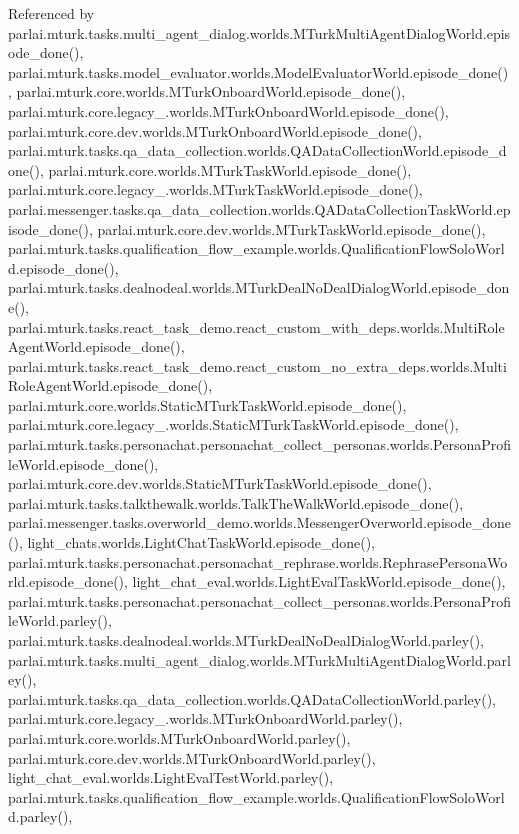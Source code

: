 Referenced by parlai.\+mturk.\+tasks.\+multi\+\_\+agent\+\_\+dialog.\+worlds.\+M\+Turk\+Multi\+Agent\+Dialog\+World.\+episode\+\_\+done(), parlai.\+mturk.\+tasks.\+model\+\_\+evaluator.\+worlds.\+Model\+Evaluator\+World.\+episode\+\_\+done(), parlai.\+mturk.\+core.\+worlds.\+M\+Turk\+Onboard\+World.\+episode\+\_\+done(), parlai.\+mturk.\+core.\+legacy\+\_.\+worlds.\+M\+Turk\+Onboard\+World.\+episode\+\_\+done(), parlai.\+mturk.\+core.\+dev.\+worlds.\+M\+Turk\+Onboard\+World.\+episode\+\_\+done(), parlai.\+mturk.\+tasks.\+qa\+\_\+data\+\_\+collection.\+worlds.\+Q\+A\+Data\+Collection\+World.\+episode\+\_\+done(), parlai.\+mturk.\+core.\+worlds.\+M\+Turk\+Task\+World.\+episode\+\_\+done(), parlai.\+mturk.\+core.\+legacy\+\_.\+worlds.\+M\+Turk\+Task\+World.\+episode\+\_\+done(), parlai.\+messenger.\+tasks.\+qa\+\_\+data\+\_\+collection.\+worlds.\+Q\+A\+Data\+Collection\+Task\+World.\+episode\+\_\+done(), parlai.\+mturk.\+core.\+dev.\+worlds.\+M\+Turk\+Task\+World.\+episode\+\_\+done(), parlai.\+mturk.\+tasks.\+qualification\+\_\+flow\+\_\+example.\+worlds.\+Qualification\+Flow\+Solo\+World.\+episode\+\_\+done(), parlai.\+mturk.\+tasks.\+dealnodeal.\+worlds.\+M\+Turk\+Deal\+No\+Deal\+Dialog\+World.\+episode\+\_\+done(), parlai.\+mturk.\+tasks.\+react\+\_\+task\+\_\+demo.\+react\+\_\+custom\+\_\+with\+\_\+deps.\+worlds.\+Multi\+Role\+Agent\+World.\+episode\+\_\+done(), parlai.\+mturk.\+tasks.\+react\+\_\+task\+\_\+demo.\+react\+\_\+custom\+\_\+no\+\_\+extra\+\_\+deps.\+worlds.\+Multi\+Role\+Agent\+World.\+episode\+\_\+done(), parlai.\+mturk.\+core.\+worlds.\+Static\+M\+Turk\+Task\+World.\+episode\+\_\+done(), parlai.\+mturk.\+core.\+legacy\+\_.\+worlds.\+Static\+M\+Turk\+Task\+World.\+episode\+\_\+done(), parlai.\+mturk.\+tasks.\+personachat.\+personachat\+\_\+collect\+\_\+personas.\+worlds.\+Persona\+Profile\+World.\+episode\+\_\+done(), parlai.\+mturk.\+core.\+dev.\+worlds.\+Static\+M\+Turk\+Task\+World.\+episode\+\_\+done(), parlai.\+mturk.\+tasks.\+talkthewalk.\+worlds.\+Talk\+The\+Walk\+World.\+episode\+\_\+done(), parlai.\+messenger.\+tasks.\+overworld\+\_\+demo.\+worlds.\+Messenger\+Overworld.\+episode\+\_\+done(), light\+\_\+chats.\+worlds.\+Light\+Chat\+Task\+World.\+episode\+\_\+done(), parlai.\+mturk.\+tasks.\+personachat.\+personachat\+\_\+rephrase.\+worlds.\+Rephrase\+Persona\+World.\+episode\+\_\+done(), light\+\_\+chat\+\_\+eval.\+worlds.\+Light\+Eval\+Task\+World.\+episode\+\_\+done(), parlai.\+mturk.\+tasks.\+personachat.\+personachat\+\_\+collect\+\_\+personas.\+worlds.\+Persona\+Profile\+World.\+parley(), parlai.\+mturk.\+tasks.\+dealnodeal.\+worlds.\+M\+Turk\+Deal\+No\+Deal\+Dialog\+World.\+parley(), parlai.\+mturk.\+tasks.\+multi\+\_\+agent\+\_\+dialog.\+worlds.\+M\+Turk\+Multi\+Agent\+Dialog\+World.\+parley(), parlai.\+mturk.\+tasks.\+qa\+\_\+data\+\_\+collection.\+worlds.\+Q\+A\+Data\+Collection\+World.\+parley(), parlai.\+mturk.\+core.\+legacy\+\_.\+worlds.\+M\+Turk\+Onboard\+World.\+parley(), parlai.\+mturk.\+core.\+worlds.\+M\+Turk\+Onboard\+World.\+parley(), parlai.\+mturk.\+core.\+dev.\+worlds.\+M\+Turk\+Onboard\+World.\+parley(), light\+\_\+chat\+\_\+eval.\+worlds.\+Light\+Eval\+Test\+World.\+parley(), parlai.\+mturk.\+tasks.\+qualification\+\_\+flow\+\_\+example.\+worlds.\+Qualification\+Flow\+Solo\+World.\+parley(), 